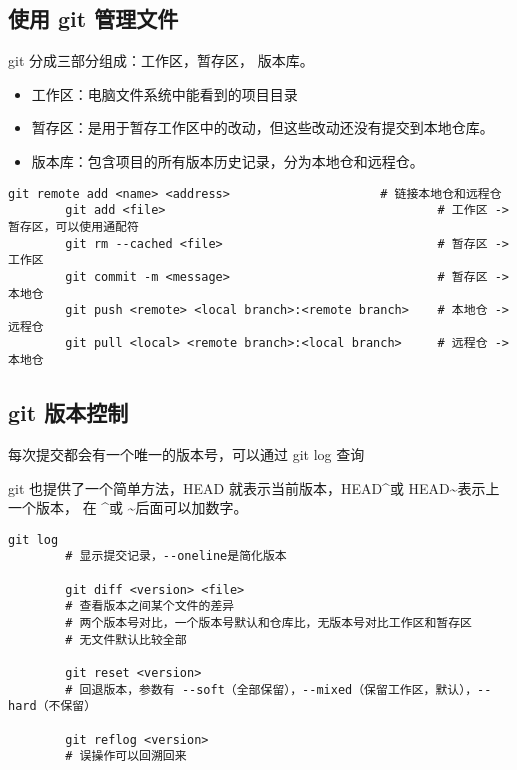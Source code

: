 \documentclass{lzc}
\begin{document}
        \subsection{使用 git 管理文件}\label{subsec:1.3}
            git 分成三部分组成：工作区，暂存区， 版本库。
            \begin{itemize}
                \item 工作区：电脑文件系统中能看到的项目目录
                \item 暂存区：是用于暂存工作区中的改动，但这些改动还没有提交到本地仓库。
                \item 版本库：包含项目的所有版本历史记录，分为本地仓和远程仓。
            \end{itemize}

            \begin{lstlisting}[label={lst:4}]
        git remote add <name> <address>                     # 链接本地仓和远程仓
        git add <file>                                      # 工作区 -> 暂存区，可以使用通配符
        git rm --cached <file>                              # 暂存区 -> 工作区
        git commit -m <message>                             # 暂存区 -> 本地仓
        git push <remote> <local branch>:<remote branch>    # 本地仓 -> 远程仓
        git pull <local> <remote branch>:<local branch>     # 远程仓 -> 本地仓
            \end{lstlisting}

        \subsection{git 版本控制}\label{subsec:1.4}
            每次提交都会有一个唯一的版本号，可以通过 git log 查询

            git 也提供了一个简单方法，HEAD 就表示当前版本，HEAD\textasciicircum 或 HEAD\textasciitilde 表示上一个版本，
            在 \textasciicircum 或 \textasciitilde 后面可以加数字。

            \begin{lstlisting}[label={lst:5}]
        git log
        # 显示提交记录，--oneline是简化版本

        git diff <version> <file>
        # 查看版本之间某个文件的差异
        # 两个版本号对比，一个版本号默认和仓库比，无版本号对比工作区和暂存区
        # 无文件默认比较全部

        git reset <version>
        # 回退版本，参数有 --soft（全部保留），--mixed（保留工作区，默认），--hard（不保留）

        git reflog <version>
        # 误操作可以回溯回来
            \end{lstlisting}
\end{document}

